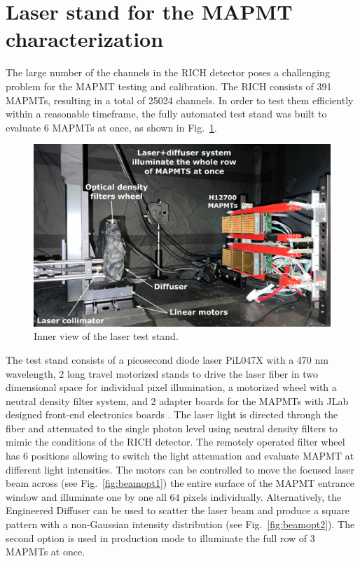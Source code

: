 
\section{Laser stand for the MAPMT characterization}
The large number of the channels in the RICH detector  poses a challenging problem for the MAPMT testing and calibration.
The RICH consists of 391 MAPMTs, resulting in a total of 25024 channels. In order to test them efficiently within a reasonable timeframe, the fully automated test stand was built to evaluate 6 MAPMTs at once, as shown in Fig.~\ref{fig:MAPMTtest}.

\begin{figure}[hbt]
	\centering
	\includegraphics[width=0.9\linewidth]{figures/LaserSetup.png}
	\caption{Inner view of the laser test stand.}
	\label{fig:MAPMTtest}
\end{figure}

The test stand consists of a picosecond diode  laser PiL047X with a 470 nm wavelength, 2 long travel motorized stands to drive the laser fiber in two dimensional space for individual pixel illumination, a motorized wheel with a neutral density filter system, and 2 adapter boards for the MAPMTs with JLab designed front-end electronics boards \cite{Contalbrigo:2020}.
The laser light is directed through the fiber and attenuated to the single photon level using neutral density filters to mimic the conditions of the RICH detector.
The remotely operated filter wheel has 6 positions allowing to switch the light attenuation and evaluate MAPMT at different light intensities.
The motors can be controlled to move the focused laser beam across (see Fig.~\ref{fig:beamopt1}) the entire surface of the MAPMT entrance window and illuminate one by one all 64 pixels individually.
Alternatively, the Engineered Diffuser can be used to scatter the laser beam and produce a square pattern with a non-Gaussian intensity distribution (see Fig.~\ref{fig:beamopt2}). 
The second option is used in production mode to illuminate the full row of 3 MAPMTs at once.

